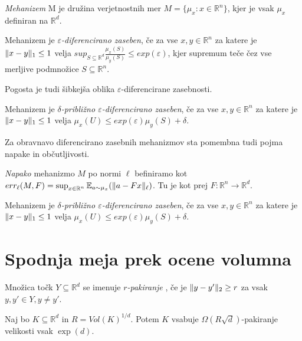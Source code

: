 \documentclass[mat1]{fmfdelo}
\DeclarePairedDelimiter{\norm}{\lVert}{\rVert}
\newcommand{\R}{\mathbb R}
\begin{document}
\begin{definicija}
	{\em Mehanizem} M je družina verjetnostnih mer $M = \{\mu_x: x \in \R^n \}$, kjer je vsak $\mu_x$ definiran na $\R^d$.
\end{definicija}

\begin{definicija}
	Mehanizem je {\em $\varepsilon$-diferencirano zaseben}, če za vse $x,y \in \R^n$ za katere je $\norm{x-y}_1 \leq 1$ velja $sup_{S \subseteq \R^d} \frac{\mu_x(S)}{\mu_y(S)} \leq exp(\varepsilon)$, kjer supremum teče čez vse merljive podmnožice $S \subseteq \R^n$.
\end{definicija}

Pogosta je tudi šibkejša oblika $\varepsilon$-diferencirane zasebnosti.

\begin{definicija}
	Mehanizem je {\em $\delta$-približno $\varepsilon$-diferencirano zaseben}, če za vse $x,y \in \R^n$ za katere je $\norm{x-y}_1 \leq 1$ velja $\mu_x(U ) \leq exp(\varepsilon) \mu_y(S) + \delta$.
\end{definicija}

Za obravnavo diferencirano zasebnih mehanizmov sta pomembna tudi pojma napake in občutljivosti.

\begin{definicija}
	{\em Napako} mehanizmo $M$ po normi $\ell$ befiniramo kot $err_\ell(M, F)=\sup_{x \in \R^n} \mathbb{E}_{a \sim \mu_x }(\norm{a-Fx}_\ell)$. Tu je kot prej $F: \R^n \to \R^d$.
\end{definicija}

\begin{definicija}
	Mehanizem je {\em $\delta$-približno $\varepsilon$-diferencirano zaseben}, če za vse $x,y \in \R^n$ za katere je $\norm{x-y}_1 \leq 1$ velja $\mu_x(U ) \leq exp(\varepsilon) \mu_y(S) + \delta$.
\end{definicija}


\section{Spodnja meja prek ocene volumna}

\begin{definicija}
	Množica točk $Y \subseteq \R^d$ se imenuje {\em $r$-pakiranje }, če je $\norm{y-y'}_2 \geq r$ za vsak $y, y' \in Y, y \neq y'$.
\end{definicija}

\begin{trditev}
	Naj bo $K \subseteq \R^d$ in $R=Vol(K)^{1/d}$. Potem $K$ vsabuje $\Omega(R\sqrt{d})$-pakiranje velikosti vsak $\exp(d)$.
\end{trditev}
\end{document}
